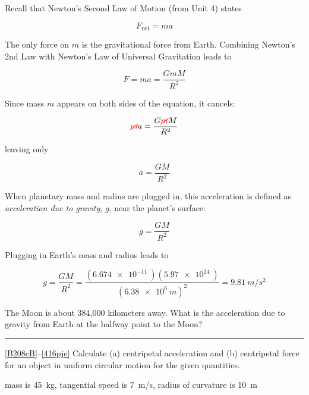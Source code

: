\documentclass{article}
\begin{document}
Recall that Newton's Second Law of Motion (from Unit 4) states

\begin{equation*}
    F_{\text{net}} = m a
\end{equation*}

The only force on $m$ is the gravitational force from Earth. Combining Newton's 2nd Law with Newton's Law of Universal Gravitation leads to

\begin{equation*}
    F = ma = \frac{G m M}{R^2}
\end{equation*}

Since mass $m$ appears on both sides of the equation, it cancels:

\begin{equation*}
    \textcolor{red}{\cancel{m}}a = \frac{G \textcolor{red}{\cancel{m}} M}{R^2}
\end{equation*}

leaving only

\begin{equation*}
    a = \frac{G M}{R^2}
\end{equation*}

When planetary mass and radius are plugged in, this acceleration is defined as \textit{acceleration due to gravity}, $g$, near the planet's surface:

\begin{equation}
    g = \frac{GM}{R^2}
\end{equation}


Plugging in Earth's mass and radius leads to 

\begin{equation*} 
    g = \frac{GM}{R^2} = \frac{\left(\SI{6.674e-11}{}\right)\left(\SI{5.97e24}{}\right)}{\left(\SI{6.38e6}{m}\right)^2} = \SI{9.81}{m/s^2}
\end{equation*}


\begin{exercise} \label{knMwSV}
The Moon is about 384,000 kilometers away. What is the acceleration due to gravity from Earth at the halfway point to the Moon? 
\end{exercise}

\hrule

\ref{B208cB}--\ref{416pje} Calculate (a) centripetal acceleration and (b) centripetal force for an object in uniform circular motion for the given quantities.

\begin{exercise} \label{B208cB}
mass is \SI{45}{kg}, tangential speed is \SI{7}{m/s}, radius of curvature is \SI{10}{m}
\end{exercise}
\end{document}
